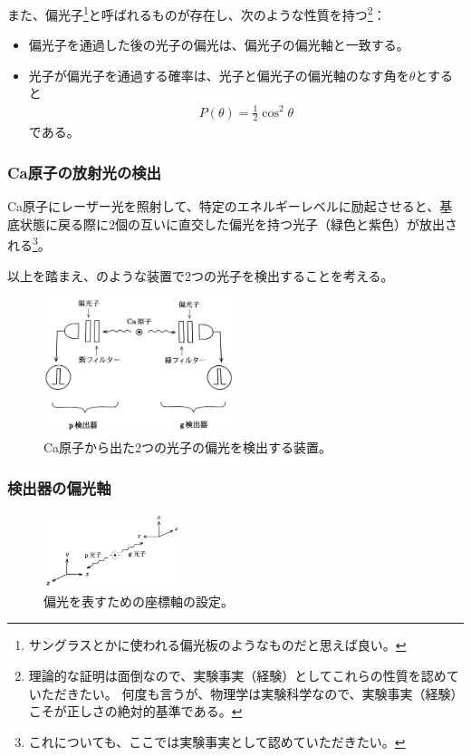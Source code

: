 \documentclass[10pt,b5paper,papersize,dvipdfmx]{jsbook}
\begin{document}
\par
また、偏光子\footnote{
  サングラスとかに使われる偏光板のようなものだと思えば良い。
}と呼ばれるものが存在し、次のような性質を持つ\footnote{
  理論的な証明は面倒なので、実験事実（経験）としてこれらの性質を認めていただきたい。
  何度も言うが、物理学は実験科学なので、実験事実（経験）こそが正しさの絶対的基準である。
}：
\begin{itemize}
  \item 偏光子を通過した後の光子の偏光は、偏光子の偏光軸と一致する。
  \item 光子が偏光子を通過する確率は、光子と偏光子の偏光軸のなす角を$\theta$とすると
    \begin{align}
      P(\theta) = \frac12 \cos^2\theta
    \end{align}
    である。
\end{itemize}

%
\subsubsection{Ca原子の放射光の検出} %

Ca原子にレーザー光を照射して、特定のエネルギーレベルに励起させると、基底状態に戻る際に2個の互いに直交した偏光を持つ光子（緑色と紫色）が放出される\footnote{
  これについても、ここでは実験事実として認めていただきたい。
}。\par
以上を踏まえ、のような装置で2つの光子を検出することを考える。

\begin{figure}[htb]
  \centering
  \includegraphics[height=40mm]{nkym/fig/souchi.jpeg}
  \caption{Ca原子から出た2つの光子の偏光を検出する装置。} %
  \label{fig:Ca-machine}
\end{figure}

%
\subsubsection{検出器の偏光軸} %

\begin{figure}[ht]
  \centering
  \includegraphics[width=40mm]{nkym/fig/zahyou-kei.jpeg}
  \caption{偏光を表すための座標軸の設定。} %
  \label{fig:zahyou-jiku}
\end{figure}
\end{document}
